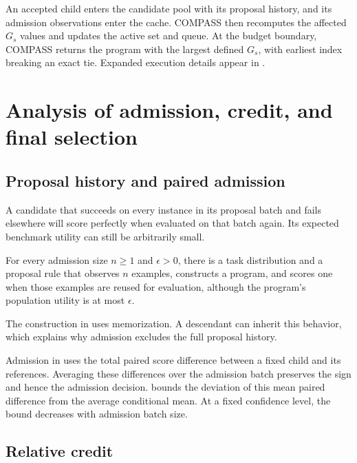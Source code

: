 An accepted child enters the candidate pool with its proposal history, and its
admission observations enter the cache.  COMPASS then recomputes the affected
$G_s$ values and updates the active set and queue.  At the budget boundary,
COMPASS returns the program with the largest defined $G_s$, with earliest index
breaking an exact tie.  Expanded execution details appear in
.

\section{Analysis of admission, credit, and final selection}
\label{sec:mechanism}

\subsection{Proposal history and paired admission}

A candidate that succeeds on every instance in its proposal batch and fails
elsewhere will score perfectly when evaluated on that batch again.  Its expected
benchmark utility can still be arbitrarily small.

\begin{proposition}
\label{prop:self_cert_leakage}
For every admission size $n\ge1$ and $\epsilon>0$, there is a task
distribution and a proposal rule that observes $n$ examples, constructs a
program, and scores one when those examples are reused for evaluation,
although the program's population utility is at most $\epsilon$.
\end{proposition}

The construction in  uses memorization.  A descendant can
inherit this behavior, which explains why admission excludes the full proposal
history.

Admission in  uses the total paired score difference
between a fixed child and its references.  Averaging these differences over the
admission batch preserves the sign and hence the admission decision.
 bounds the deviation of this mean paired difference
from the average conditional mean.  At a fixed confidence level, the bound
decreases with admission batch size.

\subsection{Relative credit}


